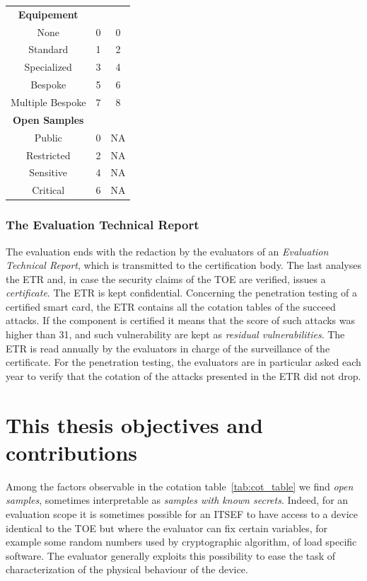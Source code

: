 \begin{table}[]
\begin{tabular}{ccc}
\midrule
\textbf{Equipement}           &                &              \\
None                          & 0              & 0            \\
Standard                      & 1              & 2            \\
Specialized                   & 3              & 4            \\
Bespoke                       & 5              & 6            \\
Multiple Bespoke              & 7              & 8            \\
\midrule
\textbf{Open Samples}         &                &              \\
Public                        & 0              & NA           \\
Restricted                    & 2              & NA           \\
Sensitive                     & 4              & NA           \\
Critical                      & 6              & NA    \\	
\bottomrule      
\end{tabular}
\end{table}


\subsubsection{The Evaluation Technical Report}
The evaluation ends with the redaction by the evaluators of an \emph{Evaluation Technical Report}, which is transmitted to the certification body. The last analyses the ETR and, in case the security claims of the TOE are verified, issues a \emph{certificate}. The ETR is kept confidential. Concerning the penetration testing of a certified smart card, the ETR contains all the cotation tables of the succeed attacks. If the component is certified it means that the score of such attacks was higher than 31, and such vulnerability are kept as \emph{residual vulnerabilities}. The ETR is read annually by the evaluators in charge of the surveillance of the certificate. For the penetration testing, the evaluators are in particular asked each year to verify that the cotation of the attacks presented in the ETR did not drop.

\section{This thesis objectives and contributions}\label{sec:this_thesis_objectives}
Among the factors observable in the cotation table~\ref{tab:cot_table} we find \emph{open samples}, sometimes interpretable as \emph{samples with known secrets}. Indeed, for an evaluation scope it is sometimes possible for an ITSEF to have access to a device identical to the TOE but where the evaluator can fix certain variables, for example some random numbers used by cryptographic algorithm, of load specific software. The evaluator generally exploits this possibility to ease the task of characterization of the physical behaviour of the device.\\

